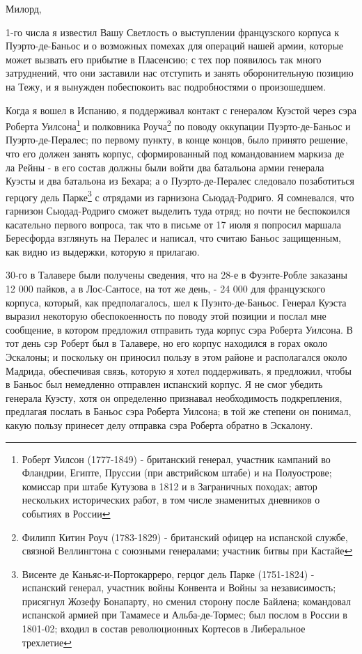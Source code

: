 \documentclass[
  oneside,
  12pt,
  titlepage]{book}
\begin{document}
Милорд,

1-го числа я известил Вашу Светлость о выступлении французского корпуса к Пуэрто-де-Баньос и о возможных помехах для операций нашей армии, которые может вызвать его прибытие в Пласенсию; с тех пор появилось так много затруднений, что они заставили нас отступить и занять оборонительную позицию на Тежу, и я вынужден побеспокоить вас подробностями о произошедшем.

Когда я вошел в Испанию, я поддерживал контакт с генералом Куэстой через сэра Роберта Уилсона\footnote{Роберт Уилсон (1777-1849) - британский генерал, участник кампаний во Фландрии, Египте, Пруссии (при австрийском штабе) и на Полуострове; комиссар при штабе Кутузова в 1812 и в Заграничных походах; автор нескольких исторических работ, в том числе знаменитых дневников о событиях в России} и полковника Роуча\footnote{Филипп Китин Роуч (1783-1829) - британский офицер на испанской службе, связной Веллингтона с союзными генералами; участник битвы при Кастайе} по поводу оккупации Пуэрто-де-Баньос и Пуэрто-де-Пералес; по первому пункту, в конце концов, было принято решение, что его должен занять корпус, сформированный под командованием маркиза де ла Рейны - в его состав должны были войти два батальона армии генерала Куэсты и два батальона из Бехара; а о Пуэрто-де-Пералес следовало позаботиться герцогу дель Парке\footnote{Висенте де Каньяс-и-Портокарреро, герцог дель Парке (1751-1824) - испанский генерал, участник войны Конвента и Войны за независимость; присягнул Жозефу Бонапарту, но сменил сторону после Байлена; командовал испанской армией при Тамамесе и Альба-де-Тормес; был послом в России в 1801-02; входил в состав революционных Кортесов в Либеральное трехлетие} с отрядами из гарнизона Сьюдад-Родриго. Я сомневался, что гарнизон Сьюдад-Родриго сможет выделить туда отряд; но почти не беспокоился касательно первого вопроса, так что в письме от 17 июля я попросил маршала Бересфорда взглянуть на Пералес и написал, что считаю Баньос защищенным, как видно из выдержки, которую я прилагаю.

30-го в Талавере были получены сведения, что на 28-е в Фуэнте-Робле заказаны 12 000 пайков, а в Лос-Сантосе, на тот же день, - 24 000 для французского корпуса, который, как предполагалось, шел к Пуэнто-де-Баньос. Генерал Куэста выразил некоторую обеспокоенность по поводу этой позиции и послал мне сообщение, в котором предложил отправить туда корпус сэра Роберта Уилсона. В тот день сэр Роберт был в Талавере, но его корпус находился в горах около Эскалоны; и поскольку он приносил пользу в этом районе и располагался около Мадрида, обеспечивая связь, которую я хотел поддерживать, я предложил, чтобы в Баньос был немедленно отправлен испанский корпус. Я не смог убедить генерала Куэсту, хотя он определенно признавал необходимость подкрепления, предлагая послать в Баньос сэра Роберта Уилсона; в той же степени он понимал, какую пользу принесет делу отправка сэра Роберта обратно в Эскалону.
\end{document}
